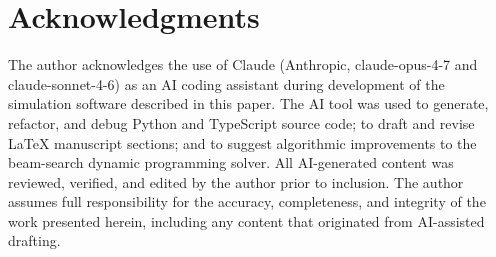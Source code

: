 \section*{Acknowledgments}

The author acknowledges the use of Claude (Anthropic, claude-opus-4-7 and
claude-sonnet-4-6) as an AI coding assistant during development of the simulation
software described in this paper. The AI tool was used to generate, refactor, and
debug Python and TypeScript source code; to draft and revise \LaTeX{} manuscript
sections; and to suggest algorithmic improvements to the beam-search dynamic
programming solver. All AI-generated content was reviewed, verified, and edited by
the author prior to inclusion. The author assumes full responsibility for the
accuracy, completeness, and integrity of the work presented herein, including any
content that originated from AI-assisted drafting.
